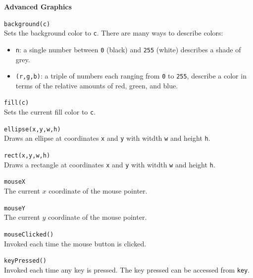 \documentclass[10pt,twocolumn]{article}
\begin{document}
\medskip

\noindent\textbf{Advanced Graphics}
\begin{description}
\item{\texttt{background(c)}}\ \\[.25em]
%
Sets the background color to \texttt{c}. There are many ways to describe colors: 
\begin{itemize}
\item \texttt{n}: a single number between \texttt{0} (black) and \texttt{255} (white) describes a shade of grey. 
\item \texttt{(r,g,b)}: a triple of numbers each ranging from
  \texttt{0} to \texttt{255}, describe a color in terms of the
  relative amounts of red, green, and blue.
\end{itemize}

\item{\texttt{fill(c)}}\ \\[.25em]
Sets the current fill color to \texttt{c}. 

\item{\texttt{ellipse(x,y,w,h)}}\ \\[.25em]
Draws an ellipse at coordinates \texttt{x} and \texttt{y} with witdth \texttt{w} and height \texttt{h}. 

\item{\texttt{rect(x,y,w,h)}}\ \\[.25em]
Draws a rectangle at coordinates \texttt{x} and \texttt{y} with witdth \texttt{w} and height \texttt{h}. 

\item{\texttt{mouseX}}\ \\[.25em]
%
The current $x$ coordinate of the mouse pointer.

\item{\texttt{mouseY}}\ \\[.25em]
%
The current $y$ coordinate of the mouse pointer.

\item{\texttt{mouseClicked()}}\ \\[.25em]
Invoked each time the mouse button is clicked.

\item{\texttt{keyPressed()}}\ \\[.25em] 
Invoked each time any key is pressed. The key pressed can be accessed
from \texttt{key}.
\end{description}
\end{document}
